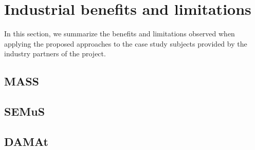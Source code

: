 \clearpage
\section{Industrial benefits and limitations}
\label{sec:EvaluationRemarks}

In this section, we summarize the benefits and limitations observed when applying the proposed approaches to the  case study subjects provided by the industry partners of the project.

\subsection*{MASS}



\subsection*{SEMuS}




\subsection*{DAMAt}




